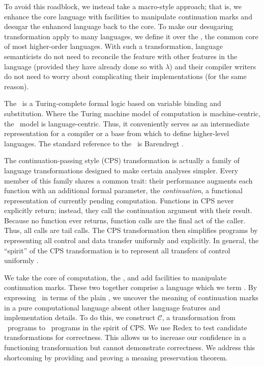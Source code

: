 To avoid this roadblock, we instead take a macro-style approach; that is, we enhance the core language with facilities to manipulate continuation marks and desugar the enhanced language back to the core. To make our desugaring transformation apply to many languages, we define it over the \lc, the common core of most higher-order languages. With such a transformation, language semanticists do not need to reconcile the feature with other features in the language (provided they have already done so with $\lambda$) and their compiler writers do not need to worry about complicating their implementations (for the same reason).

The \lc\ is a Turing-complete formal logic based on variable binding and substitution.
Where the Turing machine model of computation is machine-centric, the \lc\ model is
language-centric. Thus, it conveniently serves as an intermediate representation for a
compiler or a base from which to define higher-level languages. The standard
reference to the \lc\ is Barendregt \cite{barendregt1984lambda}.

The continuation-passing style (CPS) transformation is actually a family of
language transformations designed to make certain analyses simpler. Every member of this family
shares a common trait: their performance augments each function with an additional formal
parameter, the \emph{continuation}, a functional representation of currently pending
computation. Functions in CPS never explicitly return; instead, they call the continuation
argument with their result. Because no function ever returns, function calls are the final
act of the caller. Thus, all calls are tail calls. The CPS transformation then simplifies
programs by representing all control and data transfer uniformly and explicitly. In
general, the ``spirit'' of the CPS transformation is to represent all transfers of control
uniformly \cite{sabry1994formal}.

We take the core of computation, the \lc, and add facilities to manipulate continuation
marks. These two together comprise a language which we term \cm. By expressing \cm\ in
terms of the plain \lc, we uncover the meaning of continuation marks in a pure
computational language absent other language features and implementation details. To do
this, we construct $\mathcal{C}$, a transformation from \cm\ programs to \lc\ programs in
the spirit of CPS. We use Redex \cite{findler2010redex} to test candidate transformations
for correctness. This allows us to increase our confidence in a functioning transformation
but cannot demonstrate correctness. We address this shortcoming by providing and proving a
meaning preservation theorem.

